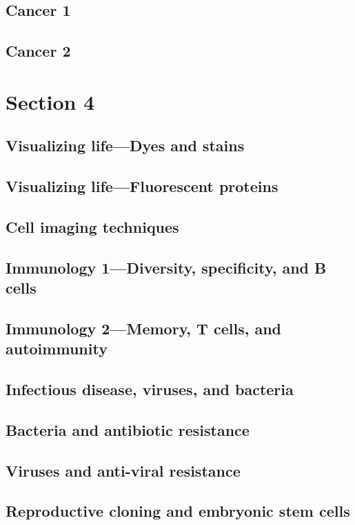 \documentclass[../introbio.tex]{subfiles}
\begin{document}
\section{Cancer 1}
\section{Cancer 2}
\chapter{Section 4}
\section{Visualizing life—Dyes and stains}
\section{Visualizing life—Fluorescent proteins}
\section{Cell imaging techniques}
\section{Immunology 1—Diversity, specificity, and B cells}
\section{Immunology 2—Memory, T cells, and autoimmunity}
\section{Infectious disease, viruses, and bacteria}
\section{Bacteria and antibiotic resistance}
\section{Viruses and anti-viral resistance}
\section{Reproductive cloning and embryonic stem cells}
\end{document}
